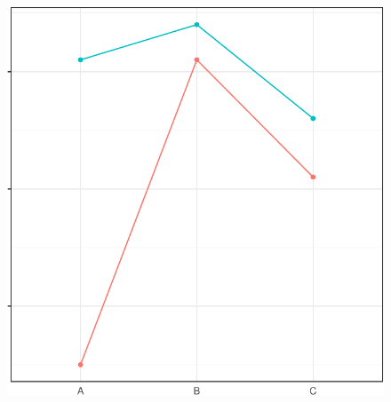 \documentclass[
  letterpaper,
  DIV=11,
  oneside]{scrreport}
\begin{document}
\begin{figure}
\begin{minipage}[t]{0.33\linewidth}
{{\includegraphics{./stat-tests-anova_files/figure-pdf/fig-anova-inter-example-2.pdf}

}

}

\end{minipage}%
%
\begin{minipage}[t]{0.33\linewidth}

{\centering 

}
\end{minipage}
\end{figure}
\end{document}
